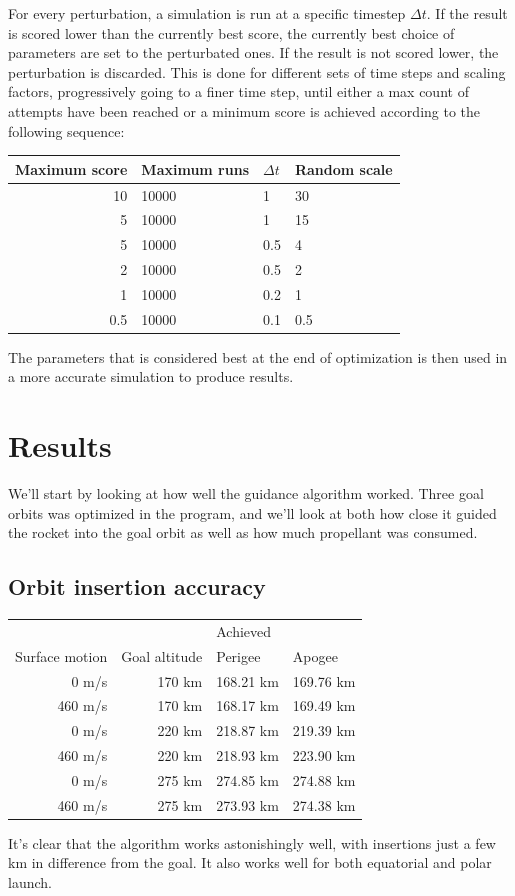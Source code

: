 \documentclass[11pt]{article}
\begin{document}
For every perturbation, a simulation is run at a specific timestep $\Delta t$. If the result is scored lower than the currently best score, the currently best choice of parameters are set to
the perturbated ones.
If the result is not scored lower, the perturbation is discarded.
This is done for different sets of time steps and scaling factors, progressively going to a finer time step, until either a max count of attempts have been reached or a minimum score is achieved according to the following sequence:
\begin{center}
  \begin{tabular}{ r | l | l | l  }
    Maximum score & Maximum runs & $\Delta t$ & Random scale \\
    \hline
    10 & 10000 & 1 & 30 \\
    5 & 10000 & 1 & 15 \\
    5 & 10000 & 0.5 & 4 \\
    2 & 10000 & 0.5 & 2 \\
    1 & 10000 & 0.2 & 1 \\
    0.5 & 10000 & 0.1 & 0.5 \\
  \end{tabular}
\end{center}

The parameters that is considered best at the end of optimization is then used in a more accurate simulation to produce results.

\section{Results}
We'll start by looking at how well the guidance algorithm worked. Three goal orbits was optimized in the program, and we'll look at both how close it guided the rocket into the goal orbit as well as how much propellant was consumed.
\subsection{Orbit insertion accuracy}
\begin{center}
  \begin{tabular}{ r | r  | l  l  }
     &   &  Achieved  \\
    Surface motion & Goal altitude & Perigee & Apogee \\
    \hline
    0 m/s & 170 km & 168.21 km & 169.76 km \\
    460 m/s & 170 km & 168.17 km & 169.49 km \\
    \hline
    0 m/s & 220 km & 218.87 km & 219.39 km \\
    460 m/s & 220 km  & 218.93 km & 223.90 km \\
    \hline
    0 m/s & 275 km & 274.85 km & 274.88 km \\
    460 m/s & 275 km & 273.93 km & 274.38 km
  \end{tabular}
\end{center}
It's clear that the algorithm works astonishingly well, with insertions just a few km in difference from the goal. It also works well for both equatorial and polar launch.
\end{document}
